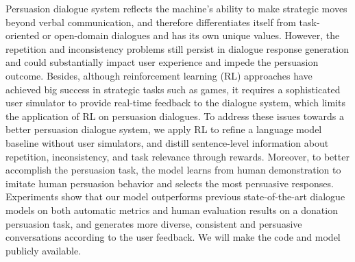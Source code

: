 Persuasion dialogue system reflects the machine's ability to make strategic moves beyond verbal communication, and therefore differentiates itself from task-oriented or open-domain dialogues and has its own unique values. However, the repetition and inconsistency problems still persist in dialogue response generation and could substantially impact user experience and impede the persuasion outcome. Besides, although reinforcement learning (RL) approaches have achieved big success in strategic tasks such as games, it requires a sophisticated user simulator to provide real-time feedback to the dialogue system, which limits the application of RL on persuasion dialogues. To address these issues towards a better persuasion dialogue system, we apply RL to refine a language model baseline without user simulators, and distill sentence-level information about repetition, inconsistency, and task relevance through rewards. Moreover, to better accomplish the persuasion task, the model learns from human demonstration to imitate human persuasion behavior and selects the most persuasive responses. Experiments show that our model outperforms previous state-of-the-art dialogue models on both automatic metrics and human evaluation results on a donation persuasion task, and generates more diverse, consistent and persuasive conversations according to the user feedback. We will make the code and model publicly available.

